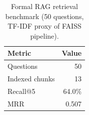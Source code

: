 \begin{table}[htbp]
\centering
\caption{Formal RAG retrieval benchmark (50 questions, TF-IDF proxy of FAISS pipeline).}
\label{tab:rag-benchmark}
\small
\begin{tabular}{@{}lr@{}}
\toprule
\textbf{Metric} & \textbf{Value} \\
\midrule
Questions & 50 \\
Indexed chunks & 13 \\
Recall@5 & 64.0\% \\
MRR & 0.507 \\
\bottomrule
\end{tabular}
\end{table}
